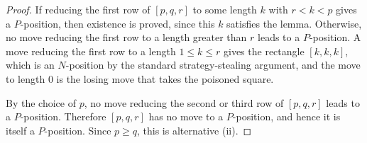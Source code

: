 \documentclass[10pt,a4paper]{amsart}
\begin{document}
\begin{proof}
If reducing the first row of $[p,q,r]$ to some length $k$ with $r<k<p$
gives a $P$-position, then existence is proved, since this $k$ satisfies the
lemma. Otherwise, no move reducing the first row to a length greater than
$r$ leads to a $P$-position. A move reducing the first row to a length
$1\le k\le r$ gives the rectangle $[k,k,k]$, which is an $N$-position by the
standard strategy-stealing argument, and the move to length $0$ is the losing
move that takes the poisoned square.

By the choice of $p$, no move reducing the second or third row of $[p,q,r]$
leads to a $P$-position. Therefore $[p,q,r]$ has no move to a $P$-position,
and hence it is itself a $P$-position. Since $p\ge q$, this is alternative
(ii).
\end{proof}
\end{document}
